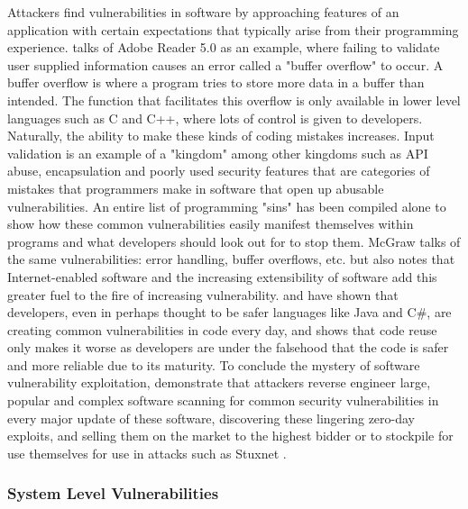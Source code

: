\documentclass[a4paper, 11pt]{article}
\begin{document}
Attackers find vulnerabilities in software by approaching features of an application with certain expectations that typically arise from their programming experience. \cite{ref:sinstsipenyuk2005seven} talks of Adobe Reader 5.0 as an example, where failing to validate user supplied information causes an error called a "buffer overflow" to occur. A buffer overflow is where a program tries to store more data in a buffer than intended. \cite{ref:jang2014survey} The function that facilitates this overflow is only available in lower level languages such as C and C++, where lots of control is given to developers. Naturally, the ability to make these kinds of coding mistakes increases. Input validation is an example of a "kingdom" among other kingdoms such as API abuse, encapsulation and poorly used security features that are categories of mistakes that programmers make in software that open up abusable vulnerabilities. \cite{ref:sinstsipenyuk2005seven} An entire list of programming "sins" has been compiled alone to show how these common vulnerabilities easily manifest themselves within programs and what developers should look out for to stop them. \cite{ref:howardprogrammingsins200519} McGraw \cite{ref:mcgraw2004software} talks of the same vulnerabilities: error handling, buffer overflows, etc. but also notes that Internet-enabled software and the increasing extensibility of software add this greater fuel to the fire of increasing vulnerability. \cite{ref:sinstsipenyuk2005seven, ref:howardprogrammingsins200519} and \cite{ref:mcgraw2004software} have shown that developers, even in perhaps thought to be safer languages like Java and C\#, are creating common vulnerabilities in code every day, and \cite{ref:honeymoonsoftware} shows that code reuse only makes it worse as developers are under the falsehood that the code is safer and more reliable due to its maturity. To conclude the mystery of software vulnerability exploitation, \cite{ref:sinstsipenyuk2005seven,ref:honeymoonsoftware,ref:howardprogrammingsins200519,ref:mcgraw2004software,ref:biometricattackvectors,ref:stuxnet2011report} demonstrate that attackers reverse engineer large, popular and complex software scanning for common security vulnerabilities in every major update of these software, discovering these lingering zero-day exploits, and selling them on the market \cite{ref:jang2014survey} to the highest bidder or to stockpile for use themselves for use in attacks such as Stuxnet \cite{ref:stuxnet2011report}.

\subsubsection{System Level Vulnerabilities}
\label{sec:systemlevel}
\end{document}
